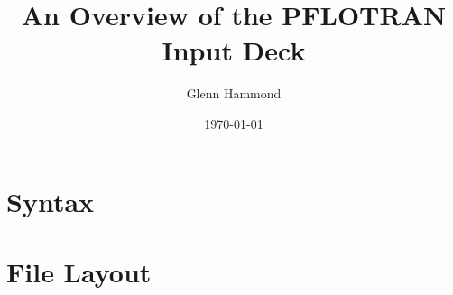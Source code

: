 \documentclass{beamer}
\title{An Overview of the PFLOTRAN Input Deck}
\author{Glenn Hammond}
\date{\today}
\begin{document}
\frame{\titlepage}

\begin{comment}
\begin{frame}
\footnotesize
\begin{itemize}
\item[] {\color{blue}Syntax}
\item[] {\color{blue}Control Cards}
\begin{itemize}
\item[] SIMULATION
\end{itemize}
\item[] {\color{blue}Required Cards}
\begin{itemize}
\item[] GRID
\item[] REGION
\item[] MATERIAL\_PROPERTY
\item[] STRATA
\item[] TIME
\item[] INITIAL\_CONDITION
\end{itemize}
\item[] {\color{blue}Required Cards for Flow}
\begin{itemize}
\item[] FLOW\_CONDITION
\end{itemize}
\item[] {\color{blue}Required Cards for Reactive Transport}
\begin{itemize}
\item[] CHEMISTRY
\item[] TRANSPORT\_CONDITION
\item[] CONSTRAINT
\end{itemize}
\item[] {\color{blue}Optional Cards}
\begin{itemize}
\item[] OUTPUT
\item[] FLUID\_PROPERTY
\end{itemize}
\end{itemize}
\end{frame}
\end{comment}

\section{Syntax}


\section{File Layout}

\end{document}
